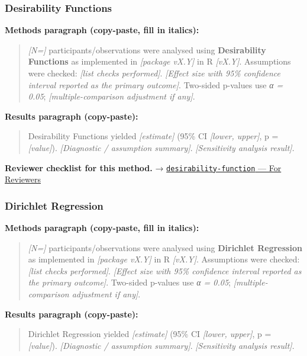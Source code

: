 \documentclass[
]{article}
\begin{document}
\subsubsection{Desirability Functions}\label{desirability-functions}

\textbf{Methods paragraph (copy-paste, fill in italics):}

\begin{quote}
\emph{{[}N={]}} participants/observations were analysed using
\textbf{Desirability Functions} as implemented in \emph{{[}package
vX.Y{]}} in R \emph{{[}vX.Y{]}}. Assumptions were checked: \emph{{[}list
checks performed{]}}. \emph{{[}Effect size with 95\% confidence interval
reported as the primary outcome{]}}. Two-sided p-values use \emph{α =
0.05}; \emph{{[}multiple-comparison adjustment if any{]}}.
\end{quote}

\textbf{Results paragraph (copy-paste):}

\begin{quote}
Desirability Functions yielded \emph{{[}estimate{]}} (95\% CI
\emph{{[}lower, upper{]}}, p = \emph{{[}value{]}}). \emph{{[}Diagnostic
/ assumption summary{]}}. \emph{{[}Sensitivity analysis result{]}}.
\end{quote}

\textbf{Reviewer checklist for this method.} →
\href{../chapters/16-design/desirability-function.Rmd\#for-reviewers}{\texttt{desirability-function}
--- For Reviewers}

\subsubsection{Dirichlet Regression}\label{dirichlet-regression}

\textbf{Methods paragraph (copy-paste, fill in italics):}

\begin{quote}
\emph{{[}N={]}} participants/observations were analysed using
\textbf{Dirichlet Regression} as implemented in \emph{{[}package
vX.Y{]}} in R \emph{{[}vX.Y{]}}. Assumptions were checked: \emph{{[}list
checks performed{]}}. \emph{{[}Effect size with 95\% confidence interval
reported as the primary outcome{]}}. Two-sided p-values use \emph{α =
0.05}; \emph{{[}multiple-comparison adjustment if any{]}}.
\end{quote}

\textbf{Results paragraph (copy-paste):}

\begin{quote}
Dirichlet Regression yielded \emph{{[}estimate{]}} (95\% CI
\emph{{[}lower, upper{]}}, p = \emph{{[}value{]}}). \emph{{[}Diagnostic
/ assumption summary{]}}. \emph{{[}Sensitivity analysis result{]}}.
\end{quote}
\end{document}
